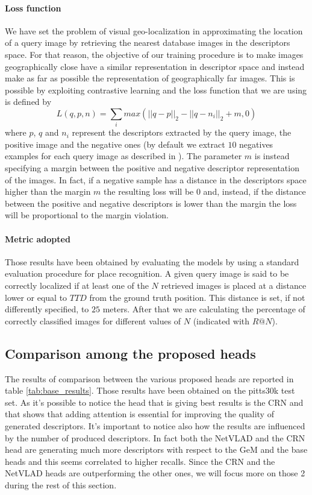 \documentclass[10pt,twocolumn,letterpaper]{article}
\begin{document}
\paragraph{Loss function}
We have set the problem of visual geo-localization in approximating the location of a query image by retrieving the nearest 
database images in the descriptors space. For that reason, the objective of our training procedure is to make images geographically
close have a similar representation in descriptor space and instead make as far as possible the representation of geographically far images.
This is possible by exploiting contrastive learning and the loss function that we are using is defined by
\begin{equation}
   L(q, p, n) = \sum_i max( {|| q - p ||}_2 - {|| q - n_i||}_2 + m, 0)
\end{equation}
where $p$, $q$ and $n_i$ represent the descriptors extracted by the query image, the positive image and the negative ones (by default we extract
$10$ negatives examples for each query image as described in ).
The parameter $m$ is instead specifying a margin between the positive and negative descriptor representation of the images.
In fact, if a negative sample has a distance in the descriptors space higher than the margin $m$ the resulting loss will be $0$ and, instead,
if the distance between the positive and negative descriptors is lower than the margin the loss will be proportional to the margin violation.
\paragraph{Metric adopted}
Those results have been obtained by evaluating the models by using a standard evaluation procedure for place recognition.
A given query image is said to be correctly localized if at least one of the $N$ retrieved images is placed at a distance lower
or equal to $TTD$ from the ground truth position. This distance is set, if not differently specified, to $25$ meters. After
that we are calculating the percentage of correctly classified images for different values of $N$ (indicated with $R@N$).  

\subsection{Comparison among the proposed heads}
The results of comparison between the various proposed heads are reported in table \ref{tab:base_results}. Those results have 
been obtained on the pitts30k test set. As it's possible to notice the head that is giving best results is the CRN and that 
shows that adding attention is essential for improving the quality of generated descriptors. It's important to notice also how 
the results are influenced by the number of produced descriptors. In fact both the NetVLAD and the CRN head are generating much 
more descriptors with respect to the GeM and the base heads and this seems correlated to higher recalls. Since the CRN and the NetVLAD
heads are outperforming the other ones, we will focus more on those 2 during the rest of this section.
\end{document}
